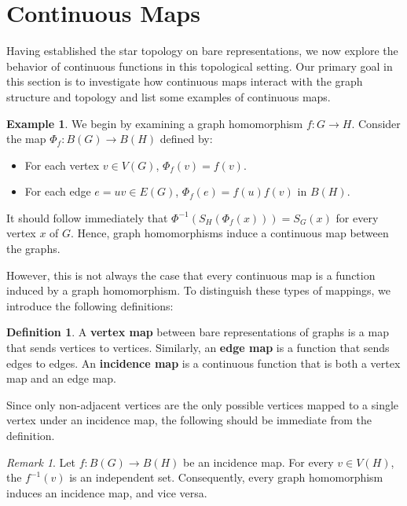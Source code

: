 \documentclass{amsart}
\theoremstyle{definition}
\newtheorem{definition}[theorem]{Definition}
\newtheorem{example}[theorem]{Example}
\theoremstyle{remark}
\newtheorem{remark}[theorem]{Remark}
\numberwithin{equation}{section}
\begin{document}
	\section{Continuous Maps}
	\label{ContiMap:sec}
	
	
	Having established the star topology on bare representations, we now explore
	the behavior of continuous functions in this topological setting. Our primary goal in this section is to investigate how continuous maps interact with the graph structure and topology and list some examples of continuous maps. 
	
	\begin{example}
		\label{Homomorphismsarecontinuous}
		We begin by examining a graph homomorphism \( f: G \to H \). Consider the map \(\Phi_f: B(G) \to B(H)\) defined by:
		\begin{itemize}
			\item For each vertex \( v \in V(G) \), \(\Phi_f(v) = f(v)\).
			\item For each edge \( e = uv \in E(G) \), \(\Phi_f(e) = f(u)f(v)\) in \(
			B(H) \).
		\end{itemize}
		It should follow immediately that \(\Phi^{-1}(S_H(\Phi_f(x))) = S_G(x)\) for every vertex \(x\) of \(G\). Hence, graph homomorphisms induce a continuous map between the graphs.
	\end{example}
	
	However, this is not always the case that every continuous map is a function induced by a graph homomorphism. To distinguish these types of mappings, we introduce the following definitions:
	
	\begin{definition}
		A \textbf{vertex map} between bare representations of graphs is a map that sends vertices to vertices. Similarly, an \textbf{edge map} is a function that sends edges to edges. An \textbf{incidence map} is a continuous function that is both a vertex map and an edge map.
	\end{definition}
	
	Since only non-adjacent vertices are the only possible vertices mapped to a single vertex under an incidence map, the following should be immediate from the definition.
	
	\begin{remark}
		\label{IncidenceMapandIndependentSets}
		Let \(f:B(G) \rightarrow B(H)\) be an incidence map. For every \(v \in V(H)\), the \(f^{-1}(v)\) is an independent set. Consequently, every graph homomorphism induces an incidence map, and vice versa.
	\end{remark}
	
\end{document}
